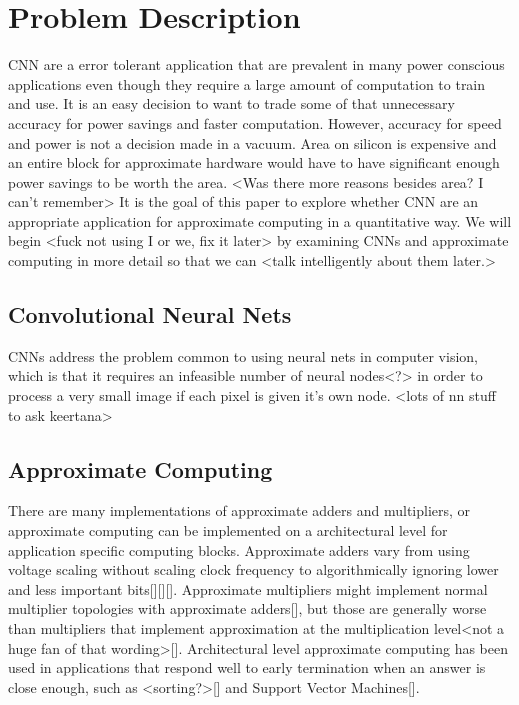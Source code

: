 \documentclass[conference]{IEEEtran}
\begin{document}
	
	
\section{Problem Description}
CNN are a error tolerant application that are prevalent in many power conscious applications even though they require a large amount of computation to train and use. It is an easy decision to want to trade some of that unnecessary accuracy for power savings and faster computation. However, accuracy for speed and power is not a decision made in a vacuum. Area on silicon is expensive and an entire block for approximate hardware would have to have significant enough power savings to be worth the area. <Was there more reasons besides area? I can't remember> It is the goal of this paper to explore whether CNN are an appropriate application for approximate computing in a quantitative way. We will begin <fuck not using I or we, fix it later> by examining CNNs and approximate computing in more detail so that we can <talk intelligently about them later.>
\subsection{Convolutional Neural Nets}
CNNs address the problem common to using neural nets in computer vision, which is that it requires an infeasible number of neural nodes<?> in order to process a very small image if each pixel is given it's own node. <lots of nn stuff to ask keertana>
\subsection{Approximate Computing}
There are many implementations of approximate adders and multipliers, or approximate computing can be implemented on a architectural level for application specific computing blocks. Approximate adders vary from using voltage scaling without scaling clock frequency to algorithmically ignoring lower and less important bits[][][]. Approximate multipliers might implement normal multiplier topologies with approximate adders[], but those are generally worse than multipliers that implement approximation at the multiplication level<not a huge fan of that wording>[]. Architectural level approximate computing has been used in applications that respond well to early termination when an answer is close enough, such as <sorting?>[] and Support Vector Machines[].
\end{document}
